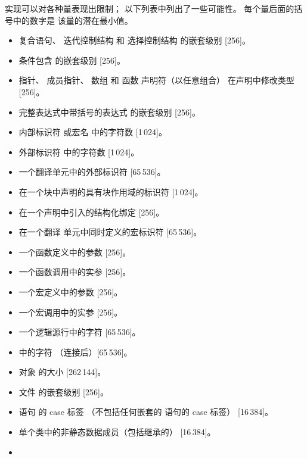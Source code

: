 
\pnum
实现可以对各种量表现出限制；
以下列表中列出了一些可能性。
每个量后面的括号中的数字是
该量的潜在最小值。
\begin{itemize}
\item%
复合语句、
迭代控制结构 和
选择控制结构 的嵌套级别 [256]。
\item%
条件包含 的嵌套级别 [256]。
\item%
指针、
成员指针、
数组 和
函数
声明符（以任意组合）
在声明中修改类型 [256]。
\item%
完整表达式中带括号的表达式 的嵌套级别 [256]。
\item%
内部标识符
或宏名 中的字符数 [1\,024]。
\item%
外部标识符 中的字符数 [1\,024]。
\item%
一个翻译单元中的外部标识符 [65\,536]。
\item%
在一个块中声明的具有块作用域的标识符 [1\,024]。
\item%
在一个声明中引入的结构化绑定 [256]。
\item%
在一个翻译
单元中同时定义的宏标识符 [65\,536]。
\item%
一个函数定义中的参数 [256]。
\item%
一个函数调用中的实参 [256]。
\item%
一个宏定义中的参数 [256]。
\item%
一个宏调用中的实参 [256]。
\item%
一个逻辑源行中的字符 [65\,536]。
\item%
 中的字符
（连接后）[65\,536]。
\item%
对象 的大小 [262\,144]。
\item%
文件 的嵌套级别 [256]。
\item%
语句 的 case 标签
（不包括任何嵌套的
语句的 case 标签）
[16\,384]。
\item%
单个类中的非静态数据成员（包括继承的） [16\,384]。
\item%

\end{itemize}
